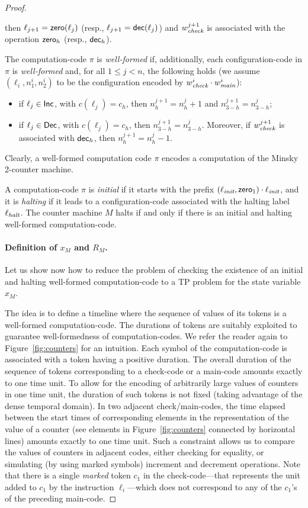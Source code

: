 \begin{proof}
\begin{itemize}
  then $\ell_{j+1}={\mathsf{zero}}(\ell_j)$ (resp., $\ell_{j+1}={\mathsf{dec}}(\ell_j)$) and  $w_{{\textit{check}}}^{j+1}$ is associated with the operation
  ${\mathsf{zero}}_h$ (resp., ${\mathsf{dec}}_h$).
\end{itemize}
%
The computation-code $\pi$ is \emph{well-formed} if, additionally, each configuration-code in $\pi$ is \emph{well-formed} and, for all $1\leq j<n$, the following holds  (we assume  $(\ell_i,n_1^{i},n_2^{i})$
to be the configuration encoded by $w_{{\textit{check}}}^{i}\cdot w_{\textit{main}}^{i}$):
%
\begin{itemize}
  \item if $\ell_j\in\mathsf{Inc}$, with $c(\ell_j)=c_h$,  then $n_h^{j+1}= n_h^{j}+1$ and $n_{3-h}^{j+1}= n_{3-h}^{j}$;
  \item if $\ell_j\in\mathsf{Dec}$, with $c(\ell_j)=c_h$, then $n_{3-h}^{j+1}= n_{3-h}^{j}$. Moreover, if  $w_{{\textit{check}}}^{j+1}$ is associated with %
  ${\mathsf{dec}}_h$, then $n_h^{j+1}= n_h^{j}-1$.
\end{itemize}
%
Clearly, a well-formed computation code  $\pi$ encodes a computation of the Minsky 2-counter machine. 

A computation-code $\pi$ is \emph{initial} if it starts with the  prefix $(\ell_{\textit{init}},{\mathsf{zero}}_1)\cdot  \ell_{\textit{init}}$, and it is \emph{halting} if it leads to a configuration-code associated with the halting label $\ell_{\textit{halt}}$. The counter machine $M$ halts if and only if there is an initial and halting well-formed computation-code.

\paragraph*{Definition of $x_M$ and $R_M$.}
Let us show now how to reduce the problem of checking the existence of an initial and halting well-formed computation-code to a TP problem for the state variable $x_M$. 

The idea is to define a timeline where the sequence of values of its tokens is a well-formed computation-code. The durations of tokens are suitably exploited to guarantee well-formedness of computation-codes. We refer the reader again to Figure~\ref{fig:counters} for an intuition. 
Each symbol of the computation-code is associated with a token having a positive duration. The overall duration of the sequence of tokens corresponding to a check-code or a main-code amounts exactly to one time unit. To allow for the encoding of 
arbitrarily large values of counters in one time unit, the duration of such tokens is not fixed (taking advantage of the dense temporal domain). In two adjacent check/main-codes, the time elapsed between the start times of corresponding elements in the representation of the value of a counter (see elements in Figure~\ref{fig:counters} connected by horizontal lines) amounts exactly to one time unit. Such a constraint allows us to compare the values of counters in adjacent codes, either checking for equality, or simulating (by using marked symbols) increment and decrement operations. Note that there is a single \emph{marked} token $c_1$ in the check-code---that represents the unit added to $c_1$ by the instruction $\ell_i$---which does not correspond to any of the $c_1$'s of the preceding main-code.


\end{proof}
